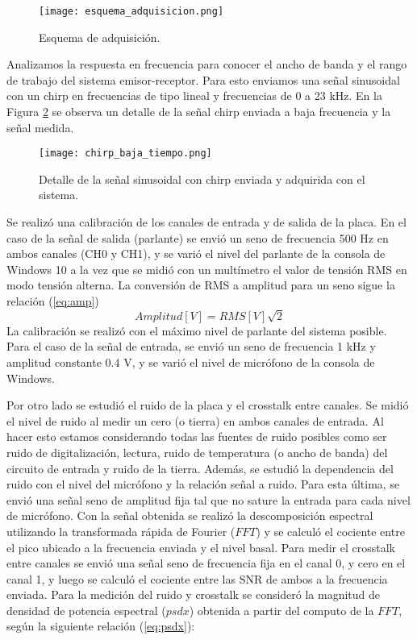 \documentclass[a4paper, 11pt]{article}
\begin{document}
\begin{figure} [H]
\centering
\texttt{[image: esquema\_adquisicion.png]}
\caption{Esquema de adquisición. \label{fig:esquema_adquisiciona}}
\end{figure} 

Analizamos la respuesta en frecuencia para conocer el ancho de banda y el rango de trabajo del sistema emisor-receptor. Para esto enviamos una señal sinusoidal con un chirp en frecuencias de tipo lineal y frecuencias de 0 a 23 kHz. %
En la Figura  \ref{fig:chirp} se observa un detalle de la señal chirp enviada a baja frecuencia y la señal medida. 

\begin{figure} [H]
\centering
\texttt{[image: chirp\_baja\_tiempo.png]}
\caption{Detalle de la señal sinusoidal con chirp enviada y adquirida con el sistema.\label{fig:chirp}}
\end{figure}
Se realizó una calibración de los canales de entrada y de salida de la placa. En el caso de la señal de salida (parlante) se envió un seno de frecuencia 500 Hz en ambos canales (CH0 y CH1), y se varió el nivel del parlante de la consola de Windows 10 a la vez que se midió con un multímetro el valor de tensión RMS en modo tensión alterna. La conversión de RMS a amplitud para un seno sigue la relación (\ref{eq:amp})
\begin{equation}\label{eq:amp}
Amplitud[V]=RMS[V]{\sqrt2}
\end{equation}
La calibración se realizó con el máximo nivel de parlante del sistema posible. Para el caso de la señal de entrada, se envió un seno de frecuencia 1 kHz y amplitud constante 0.4 V, y se varió el nivel de micrófono de la consola de Windows. 

Por otro lado se estudió el ruido de la placa y el crosstalk entre canales. Se midió el nivel de ruido al medir un cero (o tierra) en ambos canales de entrada. Al hacer esto estamos considerando todas las fuentes de ruido posibles como ser ruido de digitalización, lectura, ruido de temperatura (o ancho de banda) del circuito de entrada y ruido de la tierra. Además, se estudió la dependencia del ruido con el nivel del micrófono y la relación señal a ruido. Para esta última, se envió una señal seno de amplitud fija tal que no sature la entrada para cada nivel de micrófono. Con la señal obtenida se realizó la descomposición espectral utilizando la transformada rápida de Fourier ($FFT$) y se calculó el cociente entre el pico ubicado a la frecuencia enviada y el nivel basal. Para medir el crosstalk entre canales se envió una señal seno de frecuencia fija en el canal 0, y cero en el canal 1, y luego se calculó el cociente entre las SNR de ambos a la frecuencia enviada. Para la medición del ruido y crosstalk se consideró la magnitud de densidad de potencia espectral ($psdx$) obtenida a partir del computo de la $FFT$, según la siguiente relación (\ref{eq:psdx}):
\end{document}
